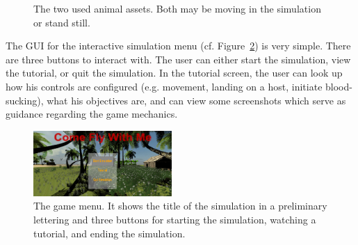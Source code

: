 \documentclass{sig-alternate-05-2015}
\begin{document}
\begin{figure}[ht!]
{}

\caption{The two used animal assets. Both may be moving in the simulation or stand still.}
\label{fig:animals}
\end{figure}

The GUI for the interactive simulation menu (cf. Figure~\ref{fig:gui}) is very simple. There are three buttons to interact with. The user can either start the simulation, view the tutorial, or quit the simulation. In the tutorial screen, the user can look up how his controls are configured (e.g. movement, landing on a host, initiate blood-sucking), what his objectives are, and can view some screenshots which serve as guidance regarding the game mechanics.

\begin{figure}[ht!]
\includegraphics[width=0.47\textwidth]{Figures/gui.png}
\caption{The game menu. It shows the title of the simulation in a preliminary lettering and three buttons for starting the simulation, watching a tutorial, and ending the simulation.}
\label{fig:gui}
\end{figure}
\end{document}
